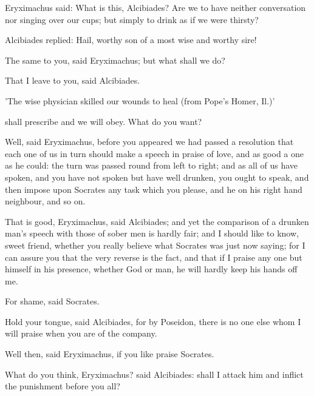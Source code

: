 \documentclass[11pt,letter]{article}
\begin{document}
\par  Eryximachus said: What is this, Alcibiades? Are we to have neither conversation nor singing over our cups; but simply to drink as if we were thirsty?

\par  Alcibiades replied: Hail, worthy son of a most wise and worthy sire!

\par  The same to you, said Eryximachus; but what shall we do?

\par  That I leave to you, said Alcibiades.

\par  'The wise physician skilled our wounds to heal (from Pope's Homer, Il.)'

\par  shall prescribe and we will obey. What do you want?

\par  Well, said Eryximachus, before you appeared we had passed a resolution that each one of us in turn should make a speech in praise of love, and as good a one as he could: the turn was passed round from left to right; and as all of us have spoken, and you have not spoken but have well drunken, you ought to speak, and then impose upon Socrates any task which you please, and he on his right hand neighbour, and so on.

\par  That is good, Eryximachus, said Alcibiades; and yet the comparison of a drunken man's speech with those of sober men is hardly fair; and I should like to know, sweet friend, whether you really believe what Socrates was just now saying; for I can assure you that the very reverse is the fact, and that if I praise any one but himself in his presence, whether God or man, he will hardly keep his hands off me.

\par  For shame, said Socrates.

\par  Hold your tongue, said Alcibiades, for by Poseidon, there is no one else whom I will praise when you are of the company.

\par  Well then, said Eryximachus, if you like praise Socrates.

\par  What do you think, Eryximachus? said Alcibiades: shall I attack him and inflict the punishment before you all?
\end{document}
